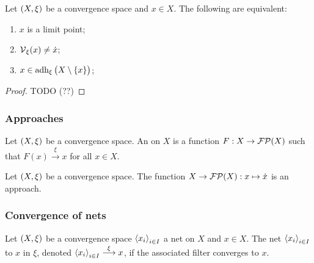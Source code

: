 \begin{proposition}
Let $\sSet{X,\xi}$ be a convergence space and $x\in X$. The following are equivalent:
\begin{enumerate}
\item $x$ is a limit point;
\item $\operatorname{\mathcal{V}}_\xi(x) \neq \dot{x}$;
\item $x\in \operatorname{adh}_\xi\big(X\setminus\{x\}\big)$;
\end{enumerate}
\end{proposition}
\begin{proof}
TODO (??)
\end{proof}

\subsubsection{Approaches}
\begin{definition}
Let $\sSet{X,\xi}$ be a convergence space. An  on $X$ is a function $F: X\to \operatorname{\mathcal{FP}}(X)$ such that $F(x) \overset{\xi}{\longrightarrow} x$ for all $x\in X$.
\end{definition}

\begin{lemma}
Let $\sSet{X,\xi}$ be a convergence space. The function $X\to \operatorname{\mathcal{FP}}(X): x\mapsto \dot{x}$ is an approach.
\end{lemma}



\subsubsection{Convergence of nets}
\begin{definition}
Let $\sSet{X,\xi}$ be a convergence space $\left\langle x_i \right\rangle_{i\in I}$ a net on $X$ and $x\in X$. The net $\left\langle x_i \right\rangle_{i\in I}$  to $x$ in $\xi$, denoted $\left\langle x_i \right\rangle_{i\in I} \overset{\xi}{\longrightarrow} x$, if the associated filter converges to $x$.
\end{definition}



